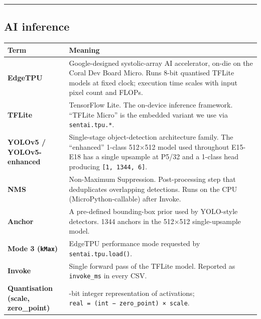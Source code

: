 \begin{center}\rule{0.5\linewidth}{0.5pt}\end{center}

\subsection{AI inference}\label{ai-inference}

{\def\LTcaptype{none} %
\begin{longtable}[]{@{}
  >{\raggedright\arraybackslash}p{}
  >{\raggedright\arraybackslash}p{}@{}}
\toprule\noalign{}
\begin{minipage}[b]{\linewidth}\raggedright
Term
\end{minipage} & \begin{minipage}[b]{\linewidth}\raggedright
Meaning
\end{minipage} \\
\midrule\noalign{}
\endhead
\bottomrule\noalign{}
\endlastfoot
\textbf{EdgeTPU} & Google-designed systolic-array AI accelerator, on-die
on the Coral Dev Board Micro. Runs 8-bit quantised TFLite models at
fixed clock; execution time scales with input pixel count and FLOPs. \\
\textbf{TFLite} & TensorFlow Lite. The on-device inference framework.
``TFLite Micro'' is the embedded variant we use via
\texttt{sentai.tpu.*}. \\
\textbf{YOLOv5 / YOLOv5-enhanced} & Single-stage object-detection
architecture family. The ``enhanced'' 1-class 512×512 model used
throughout E15-E18 has a single upsample at P5/32 and a 1-class head
producing \texttt{{[}1,\ 1344,\ 6{]}}. \\
\textbf{NMS} & Non-Maximum Suppression. Post-processing step that
deduplicates overlapping detections. Runs on the CPU
(MicroPython-callable) after Invoke. \\
\textbf{Anchor} & A pre-defined bounding-box prior used by YOLO-style
detectors. 1344 anchors in the 512×512 single-upsample model. \\
\textbf{Mode 3 (\texttt{kMax})} & EdgeTPU performance mode requested by
\texttt{sentai.tpu.load()}. \\
\textbf{Invoke} & Single forward pass of the TFLite model. Reported as
\texttt{invoke\_ms} in every CSV. \\
\textbf{Quantisation (scale, zero\_point)} & 8-bit integer
representation of activations;
\texttt{real\ =\ (int\ −\ zero\_point)\ ×\ scale}. \\
\end{longtable}
}


